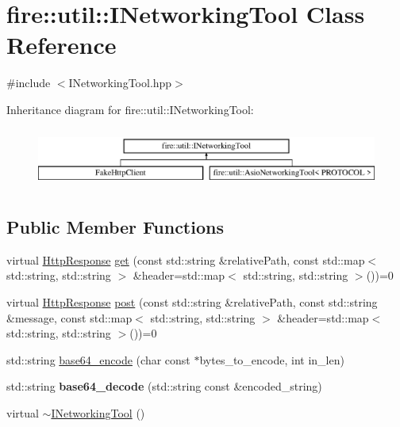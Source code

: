 \hypertarget{a00156}{}\section{fire\+:\+:util\+:\+:I\+Networking\+Tool Class Reference}
\label{a00156}


{\ttfamily \#include $<$I\+Networking\+Tool.\+hpp$>$}

Inheritance diagram for fire\+:\+:util\+:\+:I\+Networking\+Tool\+:\begin{figure}[H]
\begin{center}
\leavevmode
\includegraphics[height=2.000000cm]{a00156}
\end{center}
\end{figure}
\subsection*{Public Member Functions}
\begin{DoxyCompactItemize}
\item 
virtual \hyperlink{a00140}{Http\+Response} \hyperlink{a00156_a44b81ebf8421f0e32ed99b5e372ef007}{get} (const std\+::string \&relative\+Path, const std\+::map$<$ std\+::string, std\+::string $>$ \&header=std\+::map$<$ std\+::string, std\+::string $>$())=0
\item 
virtual \hyperlink{a00140}{Http\+Response} \hyperlink{a00156_ad6ff0e352d78f17a6f6184d1b80e0c94}{post} (const std\+::string \&relative\+Path, const std\+::string \&message, const std\+::map$<$ std\+::string, std\+::string $>$ \&header=std\+::map$<$ std\+::string, std\+::string $>$())=0
\item 
std\+::string \hyperlink{a00156_ab93be61530f01e64cb3c688976a6887b}{base64\+\_\+encode} (char const $\ast$bytes\+\_\+to\+\_\+encode, int in\+\_\+len)
\item 
std\+::string {\bfseries base64\+\_\+decode} (std\+::string const \&encoded\+\_\+string)\hypertarget{a00156_ae050106ca2338332893606cea2f3881a}{}\label{a00156_ae050106ca2338332893606cea2f3881a}

\item 
virtual \hyperlink{a00156_a2beca71d6ecb1688809f0e5e0548c17c}{$\sim$\+I\+Networking\+Tool} ()
\end{DoxyCompactItemize}

